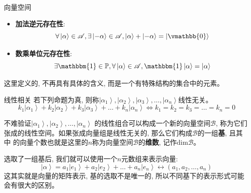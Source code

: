 \begin{define}{向量空间}
\begin{itemize}
    \item \textbf{加法逆元存在性}:\[\forall \left| \alpha  \right\rangle  \in \mathscr{A},\exists \left| { - \alpha } \right\rangle  \in \mathscr{A},\left| \alpha  \right\rangle  + \left| { - \alpha } \right\rangle  = \left| \vmathbb{0} \right\rangle \]
    \item \textbf{数乘单位元存在性}:\[\exists \mathbbm{1}\in \mathbb{P},\forall \left| \alpha  \right\rangle  \in \mathscr{A},\mathbbm{1}\left| \alpha  \right\rangle  = \left| \alpha  \right\rangle \]
\end{itemize}
\end{define}
这里定义的, 不再具有具体的含义, 而是一个有特殊结构的集合中的元素。
\begin{define}{线性相关}
    若下列命题为真, 则称${\left| {{\alpha _1}} \right\rangle  ,\left| {{\alpha _2}} \right\rangle  ,\left| {{\alpha _3}} \right\rangle , \ldots,\left| {{\alpha _n}} \right\rangle }$线性无关。
    \[{k_1}\left| {{\alpha _1}} \right\rangle  + {k_2}\left| {{\alpha _2}} \right\rangle  + {k_3}\left| {{\alpha _3}} \right\rangle +\ldots + {k_n}\left| {{\alpha _n}} \right\rangle  \Leftrightarrow {k_1} = {k_2} = {k_3} =\ldots  = {k_n} = 0\]
\end{define}
不难验证${\left| {{\alpha _1}} \right\rangle  ,\left| {{\alpha _2}} \right\rangle  , \ldots,\left| {{\alpha _n}} \right\rangle }$
的线性组合可以构成一个新的向量空间$\mathscr{B}$, 称为它们张成的线性空间。如果张成向量组是线性无关的, 那么它们构成$\mathscr{B}$的一组\textbf{基}, 且其中
的向量个数也就是这里的$n$称为向量空间$\mathscr{B}$的\textbf{维数}, 记作$\mathrm{dim} \mathscr{B}$。

选取了一组基后, 我们就可以使用一个$n$元数组来表示向量:\[\left| \alpha  \right\rangle  = {a_1}\left| {{e_1}} \right\rangle  + {a_2}\left| {{e_2}} \right\rangle  + \ldots + {a_n}\left| {{e_n}} \right\rangle  \leftrightarrow \left( {{a_1},{a_2},\ldots,{a_n}} \right)\]
这其实就是向量的矩阵表示, 基的选取不是唯一的, 所以不同基下的表示形式可能会有很大的区别。
